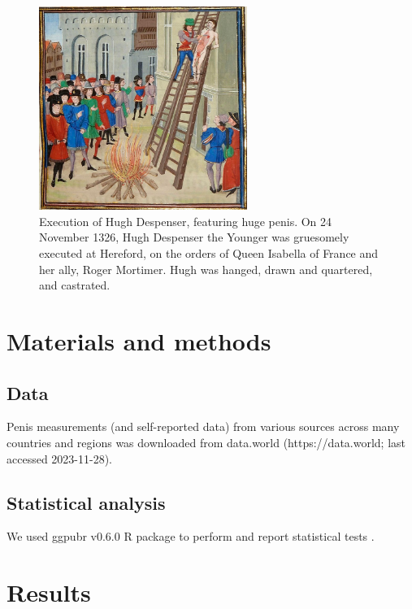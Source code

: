 \documentclass[
  10pt,
  letterpaper,
]{article}
\begin{document}
\begin{figure}

{\centering \includegraphics[width=2.67in,height=\textheight]{../figure/hugh.jpg}

}

\caption{\label{fig-hugh}Execution of Hugh Despenser, featuring huge
penis. On 24 November 1326, Hugh Despenser the Younger was gruesomely
executed at Hereford, on the orders of Queen Isabella of France and her
ally, Roger Mortimer. Hugh was hanged, drawn and quartered, and
castrated.}

\end{figure}

\hypertarget{materials-and-methods}{%
\section{Materials and methods}\label{materials-and-methods}}

\hypertarget{data}{%
\subsection{Data}\label{data}}

Penis measurements (and self-reported data) from various sources across
many countries and regions was downloaded from data.world
(https://data.world; last accessed 2023-11-28).

\hypertarget{statistical-analysis}{%
\subsection{Statistical analysis}\label{statistical-analysis}}

We used ggpubr v0.6.0 R package to perform and report statistical tests
\citep{ggpubr}.

\hypertarget{results}{%
\section{Results}\label{results}}
\end{document}
